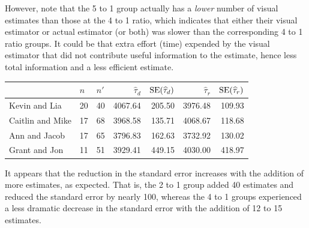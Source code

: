 \documentclass[usenames,dvipsnames]{homework}
\begin{document}
\begin{longproblem}
\begin{solution}
  However, note that the 5 to 1 group actually has a \emph{lower} number of visual estimates than those at the 4
  to 1 ratio, which indicates that either their visual estimator or actual
  estimator (or both) was slower than the corresponding 4 to 1 ratio groups. 
  It could be that
  extra effort (time) expended by the visual estimator that did not contribute
  useful information to the estimate, hence less total information and a less
  efficient estimate.
\end{solution} 

\begin{solution}
\begin{center}
\renewcommand{\arraystretch}{1.6}
\begin{tabular}{l|l l r r r r}
		 & $n$& $n'$&$\hat\tau_{d}$&$\mathrm{SE}(\widehat\tau_d)$&$\hat\tau_r $&$\mathrm{SE}(\widehat\tau_r)$\\\hline
Kevin and Lia    & 20 & 40  &  4067.64     &   205.50        &   3976.48   &    109.93\\
Caitlin and Mike & 17 & 68  &  3968.58     &   135.71        &   4068.67   &    118.68\\
Ann and Jacob    & 17 & 65  &  3796.83     &   162.63        &   3732.92   &    130.02\\
Grant and Jon    & 11 & 51  &  3929.41     &   449.15        &   4030.00   &    418.97\\\hline
\end{tabular}
\end{center}

It appears that the reduction in the standard error increases with the addition of more estimates, as expected.  That is, the 2 to 1 group added 40 estimates and reduced the standard error by nearly 100, whereas the 4 to 1 groups experienced a less dramatic decrease in the standard error with the addition of 12 to 15 estimates.  
\end{solution}



\end{longproblem}
\end{document}
